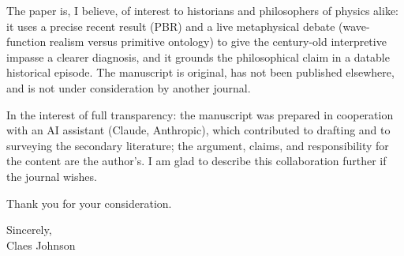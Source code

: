\documentclass[11pt]{article}
\begin{document}
The paper is, I believe, of interest to historians and philosophers of physics alike: it uses a precise recent
result (PBR) and a live metaphysical debate (wave-function realism versus primitive ontology) to give the
century-old interpretive impasse a clearer diagnosis, and it grounds the philosophical claim in a datable
historical episode. The manuscript is original, has not been published elsewhere, and is not under consideration
by another journal.

\medskip

\noindent In the interest of full transparency: the manuscript was prepared in cooperation with an AI assistant
(Claude, Anthropic), which contributed to drafting and to surveying the secondary literature; the argument,
claims, and responsibility for the content are the author's. I am glad to describe this collaboration further if
the journal wishes.

\medskip

\noindent Thank you for your consideration.

\vspace{1em}

\noindent Sincerely, \\
Claes Johnson
\end{document}

